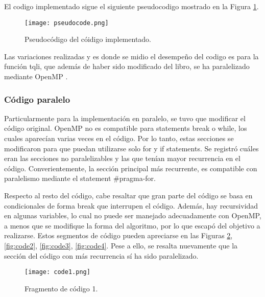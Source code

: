 El codigo implementado sigue el siguiente pseudocodigo mostrado en la Figura \ref{fig:pseudo}. 

\begin{figure}[htbp]
	\centering
	\texttt{[image: pseudocode.png]}
	\caption{Pseudocódigo del cóidigo implementado.}
	\label{fig:pseudo}
\end{figure}


Las variaciones realizadas y es donde se midio el desempeño del codigo es para la función tqli, que además de haber sido modificado del libro, se ha paralelizado mediante OpenMP \cite{al2017parallel}.


\subsubsection{Código paralelo}
Particularmente para la implementación en paralelo, se tuvo que modificar el código original. OpenMP no es compatible para statements break o while, los cuales aparecían varias veces en el código. Por lo tanto, estas secciones se modificaron para que puedan utilizarse solo for y if statements. Se registró cuáles eran las secciones no paralelizables y las que tenían mayor recurrencia en el código. Converientemente, la sección principal más recurrente, es compatible con paralelismo mediante el statement \#pragma-for. 

Respecto al resto del código, cabe resaltar que gran parte del código se basa en condicionales de forma break que interrupen el código. Además, hay recursividad en algunas variables, lo cual no puede ser manejado adecuadamente con OpenMP, a menos que se modifique la forma del algoritmo, por lo que escapó del objetivo a realizarse. Estos segmentos de código pueden apreciarse en las Figuras \ref{fig:code1}, \ref{fig:code2}, \ref{fig:code3}, \ref{fig:code4}. Pese a ello, se resalta nuevamente que la sección del código con más recurrencia sí ha sido paralelizado.


\begin{figure}
	\centering
	\texttt{[image: code1.png]}
	\caption{Fragmento de código 1.}
	\label{fig:code1}
\end{figure}

